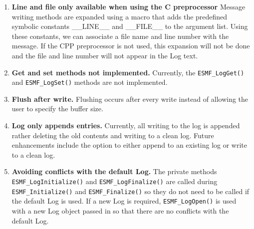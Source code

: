 %

\begin{enumerate}

\item {\bf Line and file only available when using the C preprocessor}
Message writing methods are expanded using a macro that adds the predefined 
symbolic constants \_\_LINE\_\_ and \_\_FILE\_\_ to the argument list.
Using these constants, we can associate a file name and line number with the
message.  If the CPP preprocessor is not used, this expansion will not be done
and the file and line number will not appear in the Log text.

\item{\bf Get and set methods not implemented.}
Currently, the {\tt ESMF\_LogGet()} and {\tt ESMF\_LogSet()} methods are 
not implemented.

\item{\bf Flush after write.}
Flushing occurs after every write instead of allowing the user to
specify the buffer size.

\item{\bf Log only appends entries.}
Currently, all writing to the log is appended rather deleting the old contents
and writing to a clean log.  Future enhancements include the option to either
append to an existing log or write to a clean log.

\item{\bf Avoiding conflicts with the default Log.}
The private methods {\tt ESMF\_LogInitialize()} and {\tt ESMF\_LogFinalize()} 
are called during {\tt ESMF\_Initialize()} and {\tt ESMF\_Finalize()} so they
do not need to be called if the default Log is used.  If a new Log is required,
{\tt ESMF\_LogOpen()} is used with a new Log object passed in so that there 
are no conflicts with the default Log.

\end{enumerate}
